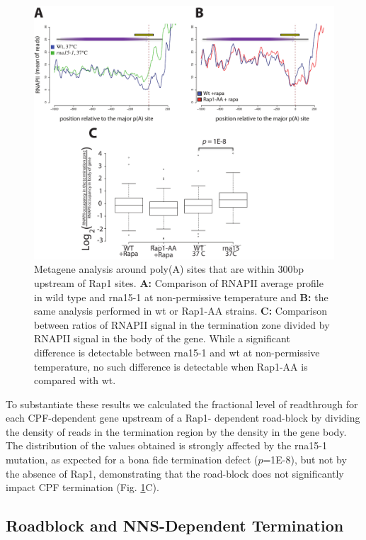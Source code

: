\begin{figure}[h]

\centering
\includegraphics[width=\textwidth]{figures/results/rap/five.pdf}
\caption[Metagene analysis around poly(A) sites that are within 300bp upstream of Rap1 sites.]{Metagene analysis around poly(A) sites that are within 300bp upstream of Rap1 sites. \textbf{A: }Comparison of RNAPII average profile in wild type and rna15-1 at non-permissive temperature and \textbf{B: }the same analysis performed in wt or Rap1-AA strains. \textbf{C: }Comparison between ratios of RNAPII signal in the termination zone divided by RNAPII signal in the body of the gene. While a significant difference is detectable between rna15-1 and wt at non-permissive temperature, no such difference is detectable when Rap1-AA is compared with wt.}
\label{fig:five}

\end{figure}

To substantiate these results we calculated the fractional level of readthrough for each CPF-dependent gene upstream of a Rap1- dependent road-block by dividing the density of reads in the termination region by the density in the gene body. The distribution of the values obtained is strongly affected by the rna15-1 mutation, as expected for a bona fide termination defect ($p$=1E-8), but not by the absence of Rap1, demonstrating that the road-block does not significantly impact CPF termination (Fig. \ref{fig:five}C). 

\singlespacing
\subsection*{Roadblock and NNS-Dependent Termination}
\doublespacing

